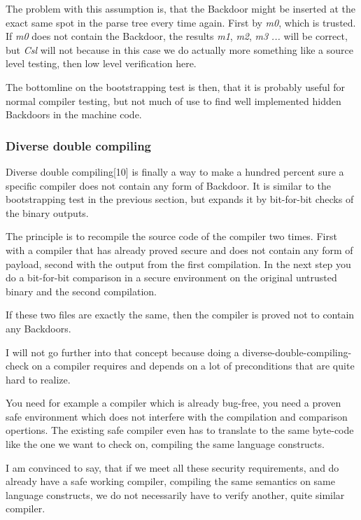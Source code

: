 \documentclass[a4paper, 12pt]{article}
\begin{document}
The problem with this assumption is, that the Backdoor might be inserted at the exact same spot in the parse tree every time again. First by \emph{m0}, which is trusted. If \emph{m0} does not contain the Backdoor, the results \emph{m1}, \emph{m2}, \emph{m3} \emph{...} will be correct, but \emph{Csl} will not because in this case we do actually more something like a source level testing, then low level verification here.

The bottomline on the bootstrapping test is then, that it is probably useful for normal compiler testing, but not much of use to find well implemented hidden Backdoors in the machine code.

\subsubsection{Diverse double compiling}

Diverse double compiling[10] is finally a way to make a hundred percent sure a specific compiler does not contain any form of Backdoor. It is similar to the bootstrapping test in the previous section, but expands it by bit-for-bit checks of the binary outputs.

The principle is to recompile the source code of the compiler two times. First with a compiler that has already proved secure and does not contain any form of payload, second with the output from the first compilation. In the next step you do a bit-for-bit comparison in a secure environment on the original untrusted binary and the second compilation.

If these two files are exactly the same, then the compiler is proved not to contain any Backdoors.

I will not go further into that concept because doing a diverse-double-compiling-check on a compiler requires and depends on a lot of preconditions that are quite hard to realize.

You need for example a compiler which is already bug-free, you need a proven safe environment which does not interfere with the compilation and comparison opertions. The existing safe compiler even has to translate to the same byte-code like the one we want to check on, compiling the same language constructs.

I am convinced to say, that if we meet all these security requirements, and do already have a safe working compiler, compiling the same semantics on same language constructs, we do not necessarily have to verify another, quite similar compiler.
\end{document}
